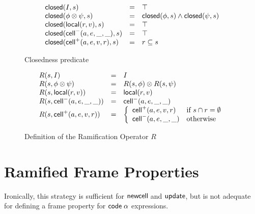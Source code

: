 \begin{figure}
\mbox{}
  \begin{displaymath}
    \begin{array}{lcl}
      \mathsf{closed}({I}, {s}) & = & \top \\
      \mathsf{closed}({\phi \otimes \psi}, {s}) & = & \mathsf{closed}({\phi}, {s}) \land \mathsf{closed}({\psi}, {s}) \\ 
      \mathsf{closed}({\mathsf{local}({r}, {v})}, {s}) & = & \top \\
      \mathsf{closed}({\mathsf{cell}^{-}({a}, {e}, {\_}, {\_})}, {s}) & = & \top \\
      \mathsf{closed}({\mathsf{cell}^{+}({a}, {e}, {v}, {r})}, {s}) & = & r \subseteq s \\
    \end{array}
  \end{displaymath}
\caption{Closedness predicate}
\label{closedness}  
\end{figure}

\begin{figure}
\mbox{}
  \begin{displaymath}
    \begin{array}{lcl}
      R(s, I)                 & = & I \\
      R(s, \phi \otimes \psi) & = & R(s, \phi) \otimes R(s, \psi) \\
      R(s, \mathsf{local}({r}, {v}))   & = & \mathsf{local}({r}, {v}) \\
      R(s, \mathsf{cell}^{-}({a}, {e}, {\_}, {\_}))    & = & \mathsf{cell}^{-}({a}, {e}, {\_}, {\_}) \\
      R(s, \mathsf{cell}^{+}({a}, {e}, {v}, {r})) & = & \left\{\begin{array}{ll}
                                                \mathsf{cell}^{+}({a}, {e}, {v}, {r}) 
                                              & \mbox{if } s \cap r = \emptyset \\
                                                \mathsf{cell}^{-}({a}, {e}, {\_}, {\_})
                                              & \mbox{otherwise}
                                              \end{array}
                                       \right.
    \end{array}
  \end{displaymath}
\caption{Definition of the Ramification Operator $R$}
\label{ramify-def}
\end{figure}

\section{Ramified Frame Properties}

Ironically, this strategy is sufficient for $\mathsf{newcell}\;$and
$\mathsf{update}$, but is not adequate for defining a frame property
for $\mathsf{code}\;{\alpha}$ expressions. 

